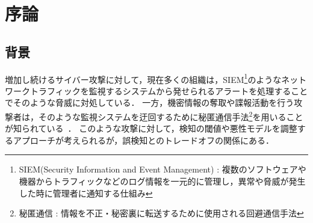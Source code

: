 \section{序論}
\subsection{背景}
増加し続けるサイバー攻撃に対して，現在多くの組織は，SIEM\footnote{SIEM(Security Information and Event Management) : 複数のソフトウェアや機器からトラフィックなどのログ情報を一元的に管理し，異常や脅威が発生した時に管理者に通知する仕組み}のようなネットワークトラフィックを監視するシステムから発せられるアラートを処理することでそのような脅威に対処している．
一方，機密情報の奪取や諜報活動を行う攻撃者は，そのような監視システムを迂回するために秘匿通信手法\footnote{秘匿通信 : 情報を不正・秘密裏に転送するために使用される回避通信手法}を用いることが知られている~\cite{mitre-custom-c2}．
このような攻撃に対して，検知の閾値や悪性モデルを調整するアプローチが考えられるが，誤検知とのトレードオフの関係にある．

